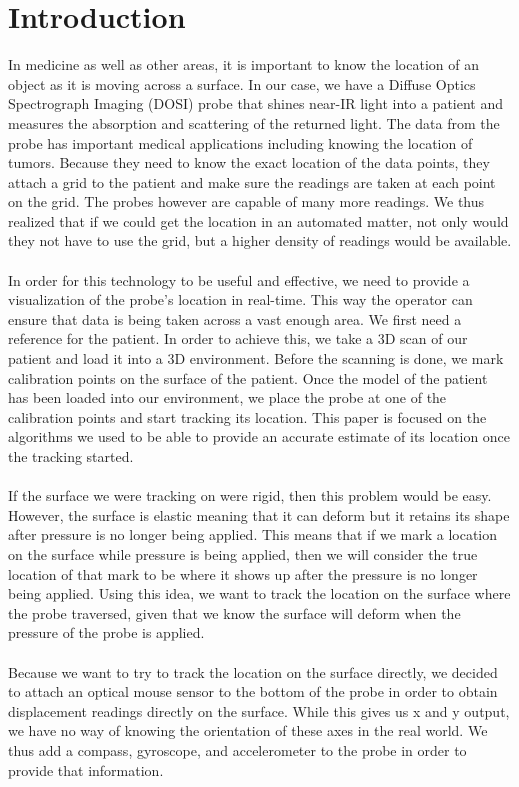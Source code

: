\section{Introduction}

In medicine as well as other areas, it is important to know the location of an object as it is moving across a surface. In our case, we have a Diffuse Optics Spectrograph Imaging (DOSI) probe that shines near-IR light into a patient and measures the absorption and scattering of the returned light. The data from the probe has important medical applications including knowing the location of tumors. Because they need to know the exact location of the data points, they attach a grid to the patient and make sure the readings are taken at each point on the grid. The probes however are capable of many more readings. We thus realized that if we could get the location in an automated matter, not only would they not have to use the grid, but a higher density of readings would be available. \\
\\
In order for this technology to be useful and effective, we need to provide a visualization of the probe's location in real-time. This way the operator can ensure that data is being taken across a vast enough area. We first need a reference for the patient. In order to achieve this, we take a 3D scan of our patient and load it into a 3D environment. Before the scanning is done, we mark calibration points on the surface of the patient. Once the model of the patient has been loaded into our environment, we place the probe at one of the calibration points and start tracking its location. This paper is focused on the algorithms we used to be able to provide an accurate estimate of its location once the tracking started. \\
\\
If the surface we were tracking on were rigid, then this problem would be easy. However, the surface is elastic meaning that it can deform but it retains its shape after pressure is no longer being applied. This means that if we mark a location on the surface while pressure is being applied, then we will consider the true location of that mark to be where it shows up after the pressure is no longer being applied. Using this idea, we want to track the location on the surface where the probe traversed, given that we know the surface will deform when the pressure of the probe is applied. \\
\\
Because we want to try to track the location on the surface directly, we decided to attach an optical mouse sensor to the bottom of the probe in order to obtain displacement readings directly on the surface. While this gives us x and y output, we have no way of knowing the orientation of these axes in the real world. We thus add a compass, gyroscope, and accelerometer to the probe in order to provide that information.\\
